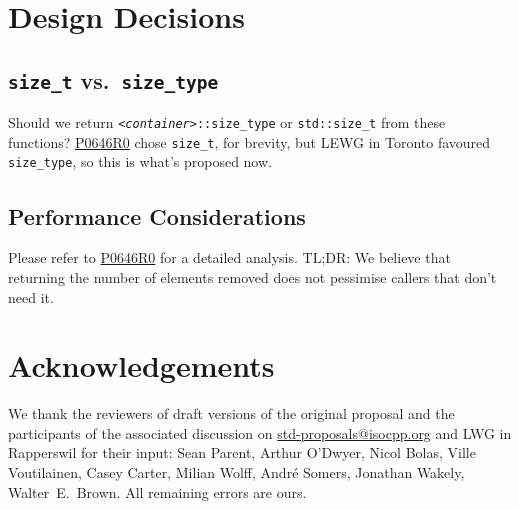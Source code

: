 \documentclass[11pt]{article}
\newcommand{\wgpaper}[1]{\href{https://wg21.link/#1}{#1}}
\newcommand{\cst}{\texttt{\textit{<container>}::size\_type}}
\begin{document}
\section{Design Decisions}

\subsection{\texttt{size\_t} vs.\ \texttt{size\_type}}

Should we return \cst{} or \texttt{std::size\_t} from these functions?
\wgpaper{P0646R0} chose \texttt{size\_t}, for brevity, but LEWG in
Toronto favoured \texttt{size\_type}, so this is what's proposed now.

\subsection{Performance Considerations}

Please refer to \wgpaper{P0646R0} for a detailed analysis. TL;DR: We
believe that returning the number of elements removed does not pessimise
callers that don't need it.

\section{Acknowledgements}

We thank the reviewers of draft versions of the original proposal and
the participants of the associated discussion on
\url{std-proposals@isocpp.org} and LWG in Rapperswil for their input:
Sean Parent, Arthur O'Dwyer, Nicol Bolas, Ville Voutilainen, Casey
Carter, Milian Wolff, Andr\'e Somers, Jonathan Wakely,
Walter~E.~Brown. All remaining errors are ours.
\end{document}
